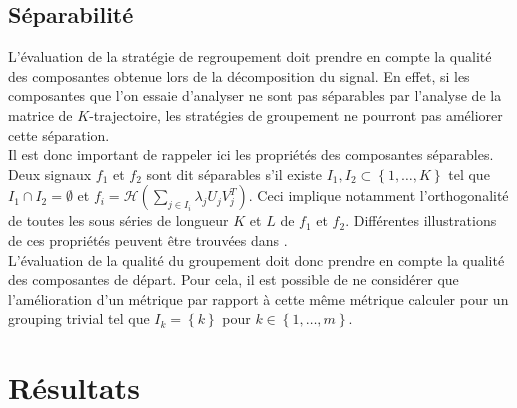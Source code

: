 \documentclass{gretsi}
\newcommand{\set}[1]{\left \{ 1, \dots, #1 \right \}}
\begin{document}

\subsection{Séparabilité}
\label{sub:sep}
    L'évaluation de la stratégie de regroupement doit prendre en compte la qualité des composantes obtenue lors de la décomposition du signal. En effet, si les composantes que l'on essaie d'analyser ne sont pas séparables par l'analyse de la matrice de $K$-trajectoire, les stratégies de groupement ne pourront pas améliorer cette séparation.\\
    
    Il est donc important de rappeler ici les propriétés des composantes séparables. Deux signaux $f_1$ et $f_2$ sont dit séparables s'il existe $I_1, I_2 \subset \left \{ 1,\dots, K \right \}$ tel que $I_1\cap I_2 = \emptyset$ et $f_i = \mathcal H(\sum_{j \in I_i} \lambda_j U_j V_j^T)$. Ceci implique notamment l'orthogonalité de toutes les sous séries de longueur $K$ et $L$ de $f_1$ et $f_2$. Différentes illustrations de ces propriétés peuvent être trouvées dans \cite{GNZ_10_SSA}.\\
    
   L'évaluation de la qualité du groupement doit donc prendre en compte la qualité des composantes de départ. Pour cela, il est possible de ne considérer que l'amélioration d'un métrique par rapport à cette même métrique calculer pour un grouping trivial tel que $I_k = \left \{ k \right \}$ pour $k \in \set{m}$.


\section{Résultats}

 
{}
\end{document}
